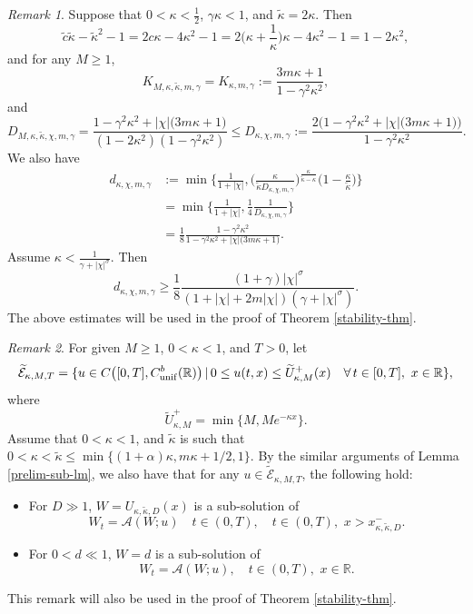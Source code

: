 \documentclass[11pt]{article} %
\theoremstyle{remark}
\newtheorem{remark}{Remark}[section]
\theoremstyle{remark}
\numberwithin{equation}{section}
\numberwithin{figure}{section}
\numberwithin{table}{section}
\newcommand\RR{\ensuremath{\mathbb{R}}}
\begin{document}
\begin{remark}
\label{prelim-sub-rk1}
Suppose that $0<\kappa <\frac{1}{2}$, $\gamma \kappa<1$,  and $\tilde\kappa =2\kappa$.  Then
$$
\tilde c \tilde \kappa-\tilde\kappa^2-1=2c\kappa -4\kappa^2-1=2\big(\kappa+\frac{1}{\kappa}\big)\kappa -4\kappa^2 -1=1-2\kappa^2,
$$
and for any $M\ge 1$,
\begin{equation}\label{K-eq}
K_{M,\kappa,\tilde\kappa,m,\gamma}=K_{\kappa,m,\gamma}:=\frac{3 m\kappa +1}{1-\gamma^2\kappa^2},
\end{equation}
and
\begin{equation}
\label{D-eq}
D_{M,\kappa,\tilde\kappa,\chi,m,\gamma}=\frac{1-\gamma^2\kappa^2 +|\chi|\big(3m\kappa+1\big)}{(1-2\kappa^2)(1-\gamma^2\kappa^2)}\le D_{\kappa,\chi,m,\gamma}:= \frac{2\Big(1-\gamma^2\kappa^2 +|\chi|\big(3m\kappa+1\big)\Big)}{1-\gamma^2\kappa^2}.
\end{equation}
We also have
\begin{align}
\label{d-eq}
d_{\kappa,\chi,m,\gamma}&:=\min\Big\{\frac{1}{1+|\chi|}, \Big(\frac{\kappa}{\tilde\kappa D_{\kappa,\chi,m,\gamma}}\Big)^{\frac{\kappa}{\tilde \kappa -\kappa}}\Big(1-\frac{\kappa}{\tilde \kappa}\Big)\Big\}\nonumber\\
&=\min\Big\{\frac{1}{1+|\chi|},\frac{1}{4} \frac{1}{D_{\kappa,\chi,m,\gamma}}\Big\}\nonumber\\
&= \frac{1}{8}   \frac{1-\gamma^2\kappa^2} {1-\gamma^2\kappa^2 +|\chi|\big(3m\kappa+1\big)}.
\end{align}
Assume {$\kappa<\frac{1}{\gamma+ |\chi|^\sigma}$.}  Then
$$
d_{\kappa,\chi,m,\gamma}\ge \frac{1}{8}\frac{(1+\gamma)|\chi|^\sigma}{(1+|\chi|+2m|\chi|)(\gamma+|\chi|^\sigma)}.
$$
The above estimates will be used in the proof of   Theorem \ref{stability-thm}.
\end{remark}



\begin{remark}
\label{prelim-sub-rk2}
For given $M\ge 1$, $0<\kappa<1$, and $T>0$, let
$$
\widetilde {\mathcal{E}}_{\kappa,M,T}=\{u\in C\big([0,T], C_{\rm unif}^b(\RR)\big)\,|\, 0\le u(t,x)\le \widetilde U_{\kappa,M}^+(x)\quad \forall\, t\in [0,T],\,\, x\in\RR\},
$$
where
$$
\widetilde U_{\kappa, M}^+=\min\{M, Me^{-\kappa x}\}.
$$
Assume that  $0<\kappa<1$,   and  $\tilde \kappa$ is such that $0<\kappa<\tilde \kappa \le \min\{ (1+\alpha)\kappa,  m\kappa +1/2,  1\}$. 
By the similar arguments of Lemma \ref{prelim-sub-lm}, we also have that
for any $u\in \widetilde{\mathcal{E}}_{\kappa,M,T}$, the following hold:
\begin{itemize}
\item[(1)] For $D\gg 1$, 
{$W=U_{\kappa,\tilde\kappa, D}(x)$}  is a sub-solution of
$$
W_t= \mathcal{A}(W;u)\quad  t\in (0,T),\quad t\in (0,T),\,\,  x>x^-_{\kappa,\tilde\kappa,D}.
$$


\item[(2)]   For $0<d\ll 1$, $W=d$ is a sub-solution of
$$
W_t= \mathcal{A}(W;u),\quad t\in (0,T),\,\,  x\in\RR.
$$ 
\end{itemize}
This remark  will also be used in the proof of   Theorem \ref{stability-thm}.
\end{remark}
\end{document}
